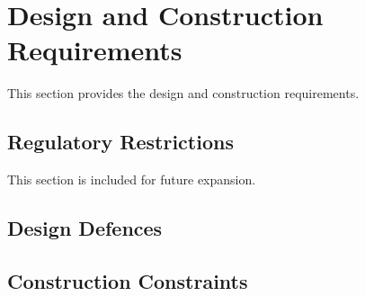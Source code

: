 \KNEADSECTIONNEWPAGE
\section{Design and Construction Requirements}
\label{lab:sec_DesignConstructionRequirements}
% 

This section provides the \ThisSys design and construction requirements.

\KNEADSUBSECTIONNEWPAGE
\subsection{Regulatory Restrictions}
\label{lab:ssec_RegulatoryRestrictions}

This section is included for future expansion.




\KNEADSUBSECTIONNEWPAGE
\subsection{Design Defences}
\label{lab:ssec_DesignDefences}






\KNEADSUBSECTIONNEWPAGE
\subsection{Construction Constraints}
\label{lab:ssec_ConstructionConstraints}

